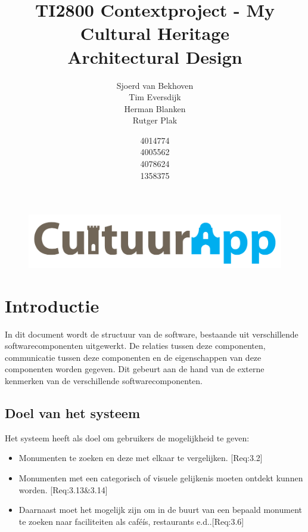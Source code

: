 \documentclass[a4paper,10pt]{article}
\begin{document}
\title{TI2800 Contextproject - My Cultural Heritage\\ Architectural Design}
\author{Sjoerd van Bekhoven\\ Tim Eversdijk \\ Herman Blanken \\ Rutger Plak \and 4014774 \\ 4005562 \\ 4078624 \\ 1358375}

\newcommand{\itemb}[1]{\item \textbf{#1}}

\maketitle
\setcounter{page}{0}
\renewcommand*\contentsname{Inhoudsopgave}

\thispagestyle{empty}
\vspace{10cm}
		\begin{figure}[ht!]
				\centering
				\includegraphics[width=\textwidth]{cultuurapp-logo.png}
			\end{figure}
\clearpage

\tableofcontents
\clearpage
\clearpage
\section{Introductie}
In dit document wordt de structuur van de software, bestaande uit verschillende softwarecomponenten uitgewerkt. De relaties tussen deze componenten, communicatie tussen deze componenten en de eigenschappen van deze componenten worden gegeven. Dit gebeurt aan de hand van de externe kenmerken van de verschillende softwarecomponenten.

	\subsection{Doel van het systeem}
	Het systeem heeft als doel om gebruikers de mogelijkheid te geven:
	\begin{itemize}
		\item Monumenten te zoeken en deze met elkaar te vergelijken. [Req:3.2]
		\item Monumenten met een categorisch of visuele gelijkenis moeten ontdekt kunnen worden. [Req:3.13\&3.14]
		\item Daarnaast moet het mogelijk zijn om in de buurt van een bepaald monument te zoeken naar faciliteiten als caf\'eís, restaurants e.d..[Req:3.6]
	\end{itemize}
	
\end{document}
